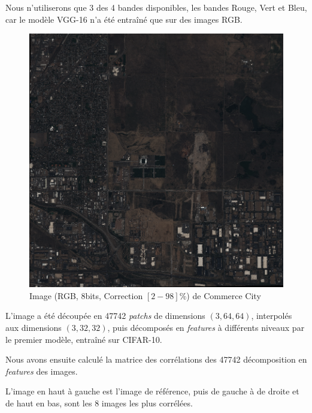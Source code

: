 \documentclass[a4paper, 11pt]{report}
\begin{document}
Nous n’utiliserons que 3 des 4 bandes disponibles, les bandes Rouge, Vert et Bleu, car le modèle VGG-16 n'a été entraîné que sur des images RGB.

\begin{figure}[H]
	\centering
	\includegraphics[scale=0.8]{Images/CommerceCity.png}
	\caption{Image (RGB, 8bits, Correction $[2-98]\%$) de Commerce City}
\end{figure}

L'image a été découpée en 47742 \emph{patchs} de dimensions $(3, 64, 64)$, interpolés aux dimensions $(3, 32, 32)$, puis décomposés en \emph{features} à différents niveaux par le premier modèle, entraîné sur CIFAR-10.

Nous avons ensuite calculé la matrice des corrélations des 47742 décomposition en \emph{features} des images.

L'image en haut à gauche est l'image de référence, puis de gauche à de droite et de haut en bas, sont les 8 images les plus corrélées.
\end{document}
